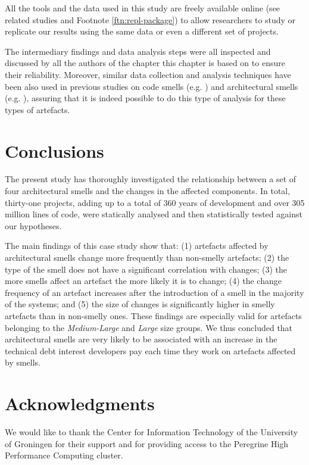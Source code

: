All the tools and the data used in this study are freely available online (see related studies and Footnote \ref{ftn:repl-package}) to allow researchers to study or replicate our results using the same data or even a different set of projects.

The intermediary findings and data analysis steps were all inspected and discussed by all the authors of the chapter this chapter is based on to ensure their reliability.
Moreover, similar data collection and analysis techniques have been also used in previous studies on code smells (e.g. \cite{Khomh2009}) and architectural smells (e.g. \cite{Le2018}), assuring that it is indeed possible to do this type of analysis for these types of artefacts.

\section{Conclusions}\label{c5:sec:conclusion}
The present study has thoroughly investigated the relationship between a set of four architectural smells and the changes in the affected components.
In total, thirty-one projects, adding up to a total of 360 years of development and  over 305 million lines of code, were statically analysed and then statistically tested against our hypotheses.

The main findings of this case study show that: (1) artefacts affected by architectural smells change more frequently than non-smelly artefacts; (2) the type of the smell does not have a significant correlation with changes; (3) the more smells affect an artefact the more likely it is to change; (4) the change frequency of an artefact increases after the introduction of a smell in the majority of the systems; and (5) the size of changes is significantly higher in smelly artefacts than in non-smelly ones.
These findings are especially valid for artefacts belonging to the \emph{Medium-Large} and \emph{Large} size groups.
We thus concluded that architectural smells are very likely to be associated with an increase in the technical debt interest developers pay each time they work on artefacts affected by smells.

\section*{Acknowledgments}
We would like to thank the Center for Information Technology of the University of Groningen for their support and for providing access to the Peregrine High Performance Computing cluster.